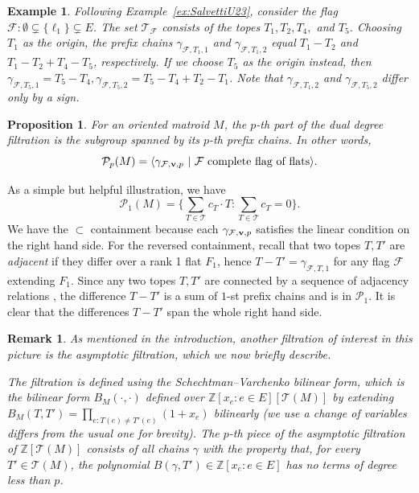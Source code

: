 \documentclass{amsart}
\newtheorem{proposition}[theorem]{Proposition}
\newtheorem{remark}[theorem]{Remark}
\newtheorem{example}[theorem]{Example}
\newcommand\Fcal{{\mathcal F}}
\newcommand\Pcal{{\mathcal P}}
\newcommand\Tcal{{\mathcal T}}
\newcommand\vv{{\bf v}}
\newcommand\ZZ{{\mathbb Z}}
\begin{document}
{\begin{example} \label{ex:prefix_chains} \rm
Following Example~\ref{ex:SalvettiU23}, consider the flag $\Fcal: \emptyset \subsetneq  \{\ell_1\} \subsetneq  E$. The set 
$\Tcal_\Fcal$ consists of the topes $T_1,T_2,T_4,$ and $T_5$.
Choosing $T_1$ as the origin, the prefix chains $\gamma_{\Fcal,T_1,1}$ and $\gamma_{\Fcal,T_1,2}$ equal $T_1-T_2$ and $T_1-T_2+T_4-T_5$, respectively.
If we choose $T_5$ as the origin instead, then $\gamma_{\Fcal,T_5,1}=T_5-T_4,\gamma_{\Fcal,T_5,2}=T_5-T_4+T_2-T_1$.
Note that $\gamma_{\Fcal,T_1,2}$ and $\gamma_{\Fcal,T_5,2}$ differ only by a sign.
\end{example}

\begin{proposition}\cite{GV87} \label{prop:prefixdualdegree}
For an oriented matroid $M$, the $p$-th part of the dual degree filtration is the subgroup spanned by its $p$-th prefix chains. 
In other words,
$$\Pcal_p(M) = \langle \gamma_{\Fcal ,\vv, p}  \ | \  \Fcal \text{ complete flag of flats} \rangle .$$
\end{proposition}

As a simple but helpful illustration, we have \[\Pcal_1(M)=\{\sum_{T\in\Tcal} c_T\cdot T:\sum_{T\in\Tcal} c_T=0\}.\]
We have the $\subset$ containment because each $\gamma_{\Fcal,\vv,p}$ satisfies the linear condition on the right hand side. For the reversed containment, recall that two topes $T,T'$ are {\em adjacent} if they differ over a rank 1 flat $F_1$, hence $T-T'=\gamma_{\Fcal,T,1}$ for any flag $\Fcal$ extending $F_1$.
Since any two topes $T,T'$ are connected by a sequence of adjacency relations \cite[Lemma~4.4.1]{BLSWZ}, the difference $T-T'$ is a sum of $1$-st prefix chains and is in $\Pcal_1$. It is clear that the differences $T-T'$ span the whole right hand side. 

\begin{remark} \label{rem:asym}
\rm
As mentioned in the introduction, another filtration of interest in this picture is the {\em asymptotic filtration}, which we now briefly describe.

The filtration is defined using the {\em Schechtman--Varchenko bilinear form}, which is the bilinear form $B_M(\cdot,\cdot)$ defined over $\ZZ[x_e:e\in E][\Tcal(M)]$ by extending $B_M(T,T')=\prod_{e: T(e)\neq T'(e)}(1+x_e)$ bilinearly (we use a change of variables differs from the usual one for brevity).
The $p$-th piece of the asymptotic filtration of $\ZZ [\Tcal(M)]$ consists of all chains $\gamma$ with the property that, for every $T'\in\Tcal(M)$, the polynomial $B(\gamma, T')\in\ZZ[x_e: e\in E]$ has no terms of degree less than $p$.
\end{remark}

}
\end{document}
